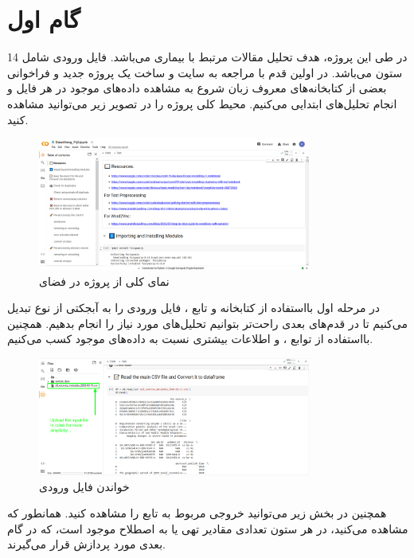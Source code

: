 \documentclass{article}
\begin{document}


\tableofcontents
\newpage

\section{گام اول}  
در طی این پروژه، هدف تحلیل مقالات مرتبط با بیماری  می‌باشد. فایل ورودی شامل 14 ستون می‌باشد.
در اولین قدم با مراجعه به سایت  و ساخت یک پروژه جدید و فراخوانی بعضی از کتابخانه‌های معروف زبان  شروع به مشاهده داده‌های موجود در هر فایل و انجام تحلیل‌های ابتدایی می‌کنیم.
محیط کلی پروژه را در تصویر زیر می‌توانید مشاهده کنید.
\begin{figure}[ht]
        \centering
        \includegraphics[width=0.8\textwidth]{step-1-colab-env.png}
        \caption{نمای کلی از پروژه  در فضای }
        \label{fig:fig1}
    \end{figure}
    
در مرحله اول بااستفاده از کتابخانه  و تابع ، فایل ورودی را به آبجکتی از نوع  تبدیل می‌کنیم تا در قدم‌های بعدی راحت‌تر بتوانیم تحلیل‌های مورد نیاز را انجام بدهیم.
همچنین بااستفاده از توابع ،  و  اطلاعات بیشتری نسبت به داده‌های موجود کسب می‌کنیم.

\begin{figure}[ht]
        \centering
        \includegraphics[width=0.8\textwidth]{step-1-read-csv.png}
        \caption{خواندن فایل ورودی}
        \label{fig:fig2}
    \end{figure}
\newpage
همچنین در بخش زیر می‌توانید خروجی مربوط به تابع  را مشاهده کنید. همانطور که مشاهده می‌کنید، در هر ستون تعدادی مقادیر تهی یا به اصطلاح  موجود است، که در گام بعدی مورد پردازش قرار می‌گیرند.
\lr{}
\end{document}
